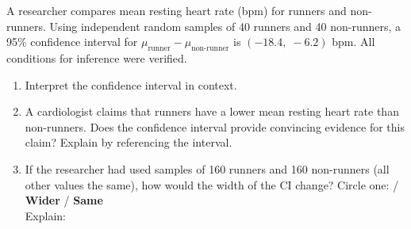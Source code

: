 \documentclass[10pt]{article}
\begin{document}
\namedateperiod

\vspace{0.15in}

A researcher compares mean resting heart rate (bpm) for runners and non-runners.
Using independent random samples of 40 runners and 40 non-runners,
a 95\% confidence interval for $\mu_{\text{runner}} - \mu_{\text{non-runner}}$ is
$(-18.4,\; -6.2)$ bpm. All conditions for inference were verified.

\begin{enumerate}
  \item Interpret the confidence interval in context.

  \item A cardiologist claims that runners have a lower mean resting heart rate than
        non-runners. Does the confidence interval provide convincing evidence for this
        claim? Explain by referencing the interval.

  \item If the researcher had used samples of 160 runners and 160 non-runners
        (all other values the same), how would the width of the CI change?
        Circle one: \quad {} \quad / \quad \textbf{Wider} \quad / \quad \textbf{Same} \\[4pt]
        Explain: 
\end{enumerate}
\end{document}
